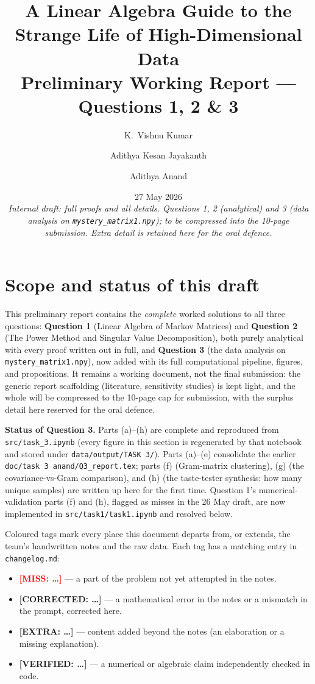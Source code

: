 \documentclass[12pt,a4paper]{article}
\title{\vspace{-1.6cm}\Huge\bfseries A Linear Algebra Guide to the\\Strange Life of High-Dimensional Data\\[0.4em]
\Large Preliminary Working Report --- Questions 1, 2 \& 3}
\author{K.\ Vishnu Kumar \and Adithya Kesan Jayakanth \and Adithya Anand}
\date{27 May 2026\\[0.3em]\small\itshape Internal draft: full proofs and all details.
Questions 1, 2 (analytical) and 3 (data analysis on \texttt{mystery\_matrix1.npy});
to be compressed into the 10-page submission. Extra detail is retained here for the oral defence.}
\newcommand{\miss}[1]{{\textbf{\textcolor{red}{[MISS: #1]}}}}
\newcommand{\fix}[1]{{\textbf{\textcolor{orange!85!black}{[CORRECTED: #1]}}}}
\newcommand{\extra}[1]{{\textbf{\textcolor{blue!80!black}{[EXTRA: #1]}}}}
\newcommand{\verified}[1]{{\textbf{\textcolor{green!45!black}{[VERIFIED: #1]}}}}
\theoremstyle{definition}
\begin{document}
\maketitle
\thispagestyle{fancy}

\section*{Scope and status of this draft}

This preliminary report contains the \emph{complete} worked solutions to all three
questions: \textbf{Question 1} (Linear Algebra of Markov Matrices) and \textbf{Question 2}
(The Power Method and Singular Value Decomposition), both purely analytical with every
proof written out in full, and \textbf{Question 3} (the data analysis on
\texttt{mystery\_matrix1.npy}), now added with its full computational pipeline, figures,
and propositions. It remains a working document, not the final submission: the generic
report scaffolding (literature, sensitivity studies) is kept light, and the whole will be
compressed to the 10-page cap for submission, with the surplus detail here reserved for the
oral defence.

\textbf{Status of Question 3.} Parts (a)--(h) are complete and reproduced from
\texttt{src/task\_3.ipynb} (every figure in this section is regenerated by that notebook and
stored under \texttt{data/output/TASK 3/}). Parts (a)--(e) consolidate the earlier
\texttt{doc/task 3 anand/Q3\_report.tex}; parts (f) (Gram-matrix clustering), (g) (the
covariance-vs-Gram comparison), and (h) (the taste-tester synthesis: how many unique samples) are
written up here for the first time. Question 1's
numerical-validation parts (f) and (h), flagged as misses in the 26 May draft, are now
implemented in \texttt{src/task1/task1.ipynb} and resolved below.

Coloured tags mark every place this document departs from, or extends, the team's
handwritten notes and the raw data. Each tag has a matching entry in \texttt{changelog.md}:
\begin{itemize}[leftmargin=1.4em, itemsep=1pt]
  \item \miss{\dots} --- a part of the problem not yet attempted in the notes.
  \item \fix{\dots} --- a mathematical error in the notes or a mismatch in the prompt, corrected here.
  \item \extra{\dots} --- content added beyond the notes (an elaboration or a missing explanation).
  \item \verified{\dots} --- a numerical or algebraic claim independently checked in code.
\end{itemize}
\end{document}
